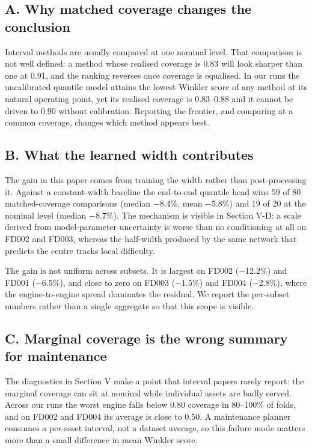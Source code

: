 \subsection{A. Why matched coverage changes the conclusion}\label{a.-why-matched-coverage-changes-the-conclusion}

Interval methods are usually compared at one nominal level. That comparison is not well defined: a method whose realised coverage is 0.83 will look sharper than one at 0.91, and the ranking reverses once coverage is equalised. In our runs the uncalibrated quantile model attains the lowest Winkler score of any method at its natural operating point, yet its realised coverage is 0.83--0.88 and it cannot be driven to 0.90 without calibration. Reporting the frontier, and comparing at a common coverage, changes which method appears best.

\subsection{B. What the learned width contributes}\label{b.-what-the-learned-width-contributes}

The gain in this paper comes from training the width rather than post-processing it. Against a constant-width baseline the end-to-end quantile head wins 59 of 80 matched-coverage comparisons (median −8.4\%, mean −5.8\%) and 19 of 20 at the nominal level (median −8.7\%). The mechanism is visible in Section V-D: a scale derived from model-parameter uncertainty is worse than no conditioning at all on FD002 and FD003, whereas the half-width produced by the same network that predicts the centre tracks local difficulty.

The gain is not uniform across subsets. It is largest on FD002 (−12.2\%) and FD001 (−6.5\%), and close to zero on FD003 (−1.5\%) and FD004 (−2.8\%), where the engine-to-engine spread dominates the residual. We report the per-subset numbers rather than a single aggregate so that this scope is visible.

\subsection{C. Marginal coverage is the wrong summary for maintenance}\label{c.-marginal-coverage-is-the-wrong-summary-for-maintenance}

The diagnostics in Section V make a point that interval papers rarely report: the marginal coverage can sit at nominal while individual assets are badly served. Across our runs the worst engine falls below 0.80 coverage in 80--100\% of folds, and on FD002 and FD004 its average is close to 0.50. A maintenance planner consumes a per-asset interval, not a dataset average, so this failure mode matters more than a small difference in mean Winkler score.

